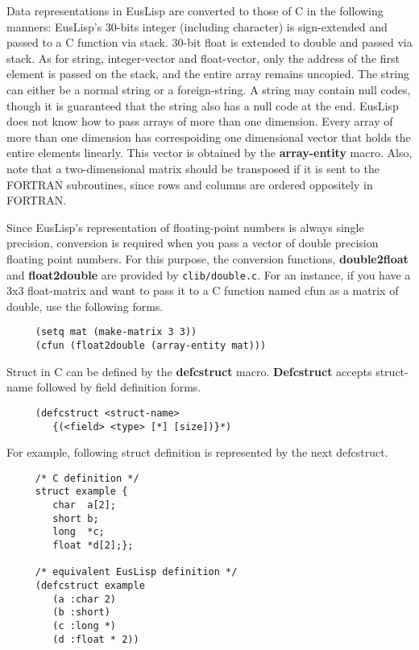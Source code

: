 Data representations in EusLisp are converted to those of C in the following
manners:
EusLisp's 30-bits integer (including character)
is sign-extended and passed to a C function via stack.
30-bit float is extended to double and passed via stack.
As for string, integer-vector and float-vector,
only the address of the first element is passed on the stack,
and the entire array remains uncopied.
The string can either be a normal string or a foreign-string.
A string may contain null codes, though it is guaranteed
that the string also has a null code at the end.
EusLisp does not know how to pass arrays of more than one dimension.
Every array of more than one dimension has correspoiding one dimensional
vector that holds the entire elements linearly.
This vector is obtained by the {\bf array-entity} macro.
Also, note that a two-dimensional matrix should be transposed
if it is sent to the FORTRAN subroutines, since rows and columns
are ordered oppositely in FORTRAN.

Since EusLisp's representation of floating-point numbers is always single
precision, conversion is required when you pass a vector of double precision
floating point numbers.
For this purpose, the conversion functions,
{\bf double2float} and {\bf float2double} are provided
by {\tt clib/double.c}.
For an instance, if you have a 3x3 float-matrix and want to pass it to a C
function named cfun as a matrix of double, use the following forms.
\begin{verbatim}
     (setq mat (make-matrix 3 3))
     (cfun (float2double (array-entity mat)))
\end{verbatim}

Struct in C can be defined by the {\bf defcstruct} macro.
{\bf Defcstruct} accepts struct-name followed by 
field definition forms.

\begin{verbatim}
     (defcstruct <struct-name>
        {(<field> <type> [*] [size])}*)
\end{verbatim}
For example, following struct definition is represented by the next defcstruct.
\begin{verbatim}
     /* C definition */
     struct example {
        char  a[2];
        short b;
        long  *c;
        float *d[2];};

     /* equivalent EusLisp definition */
     (defcstruct example
        (a :char 2)
        (b :short)
        (c :long *)
        (d :float * 2))
\end{verbatim}

